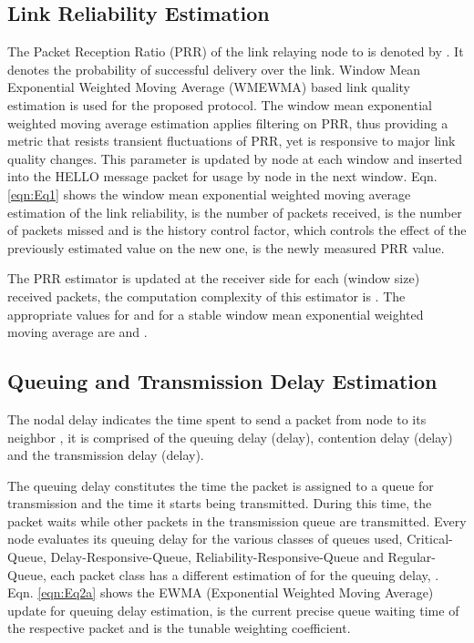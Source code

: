 \documentclass[fleqn,twoside]{article}
\begin{document}
\subsection{Link Reliability Estimation}
The Packet Reception Ratio (PRR) of the link relaying node  to  is denoted by . It denotes the probability of successful 
delivery over the link. Window Mean Exponential Weighted Moving Average (WMEWMA) based link quality estimation is used for the proposed protocol. The window mean exponential weighted moving average estimation applies filtering on PRR, thus providing a metric that resists transient fluctuations of PRR, yet is responsive to major link quality changes.
This parameter is updated by node  at each window and inserted into the HELLO message packet for usage by node  in the next window. 
Eqn. \ref{eqn:Eq1} shows the window mean exponential weighted moving average estimation of the link reliability,  is the number of packets received,  is the number of packets missed and  is the history control factor, which controls the effect of the previously estimated value on the new one,  is the newly measured PRR value.


The PRR estimator is updated at the receiver side for each  (window size) received packets, the computation complexity of
this estimator is . The appropriate values for  and  for a stable window mean exponential weighted moving average are  and \cite{EELRE1}.


\subsection{Queuing and Transmission Delay Estimation}
The nodal delay indicates the time spent to send a packet from node  to its neighbor , it is comprised of the 
queuing delay (delay), contention delay (delay) and the transmission delay (delay).

The queuing delay constitutes the time the packet is assigned to a queue for transmission and the time it starts being transmitted. During this time, the packet waits while other packets in the transmission queue are transmitted.
Every node evaluates its queuing delay  for the various classes of queues used,  Critical-Queue, Delay-Responsive-Queue, Reliability-Responsive-Queue and Regular-Queue, each packet class has a different estimation of  for the queuing 
delay,  . Eqn. \ref{eqn:Eq2a} shows the EWMA (Exponential Weighted Moving Average) update for queuing delay estimation,  is the current precise queue waiting time of the respective packet and  is the 
tunable weighting coefficient.
\end{document}
